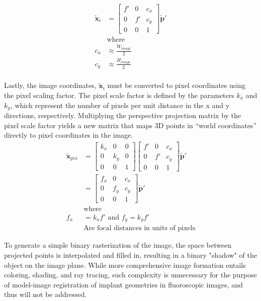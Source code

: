 \begin{equation}
    \begin{aligned}
        \tilde{\mathbf{x}}_{i} &= \begin{bmatrix}
            f' & 0 & c_x \\ 0 & f' & c_y \\ 0 & 0 & 1 
        \end{bmatrix} \tilde{\mathbf{p}}' \\
        &\text{where} \\
        c_x &\approx \frac{W_{image}}{2} \\
        c_y &\approx \frac{H_{image}}{2} \\
    \end{aligned}
    \label{eq:principal-point}
\end{equation}


Lastly, the image coordinates, $\tilde{\mathbf{x}}_{i}$ must be converted to pixel coordinates using the pixel scaling factor.
The pixel scale factor is defined by the parameters $k_x$ and $k_y$, which represent the number of pixels per unit distance in the x and y directions, respectively.
Multiplying the perspective projection matrix by the pixel scale factor yields a new matrix that maps 3D points in ``world coordinates'' directly to pixel coordinates in the image.
\begin{equation}
    \begin{aligned}
        \tilde{\mathbf{x}}_{pix} &= \begin{bmatrix}
            k_x & 0& 0 \\ 0 & k_y & 0 \\ 0 & 0 & 1
        \end{bmatrix} \begin{bmatrix}
            f' & 0 & c_x \\ 0 & f' & c_y \\ 0 & 0 & 1 
        \end{bmatrix}\tilde{\mathbf{p}}' \\
        & = \begin{bmatrix}
            f_x & 0 & c_x \\ 0 & f_y & c_y \\ 0 & 0 & 1 
        \end{bmatrix}\tilde{\mathbf{p}}'\\
        &\text{where}\\
        f_x &= k_x f' \text{        and        } f_y = k_y f' \\
        &\text{Are focal distances in units of pixels} 
    \end{aligned}
    \label{eq:pixel-scaling}
\end{equation}


To generate a simple binary rasterization of the image, the space between projected points is interpolated and filled in, resulting in a binary "shadow" of the object on the image plane.
While more comprehensive image formation entails coloring, shading, and ray tracing, such complexity is unnecessary for the purpose of model-image registration of implant geometries in fluoroscopic images, and thus will not be addressed.

